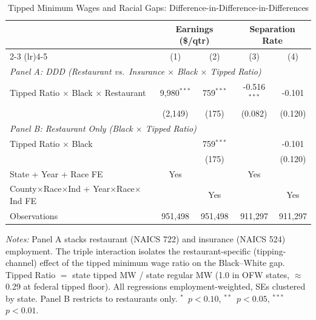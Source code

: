 
\begin{table}[t]
\centering
\caption{Tipped Minimum Wages and Racial Gaps: Difference-in-Difference-in-Differences}
\label{tab:main}
\begin{tabular}{lcccc}
\toprule
 & \multicolumn{2}{c}{Earnings (\$/qtr)} & \multicolumn{2}{c}{Separation Rate} \\
 \cmidrule(lr){2-3} \cmidrule(lr){4-5}
 & (1) & (2) & (3) & (4) \\
\midrule
\multicolumn{5}{l}{\textit{Panel A: DDD (Restaurant vs.\ Insurance $\times$ Black $\times$ Tipped Ratio)}} \\[3pt]
Tipped Ratio $\times$ Black $\times$ Restaurant & 9,980$^{***}$ & 759$^{***}$ & -0.516$^{***}$ & -0.101 \\
 & (2,149) & (175) & (0.082) & (0.120) \\[6pt]
\multicolumn{5}{l}{\textit{Panel B: Restaurant Only (Black $\times$ Tipped Ratio)}} \\[3pt]
Tipped Ratio $\times$ Black & & 759$^{***}$ & & -0.101 \\
 & & (175) & & (0.120) \\[6pt]
\midrule
State + Year + Race FE & Yes & & Yes & \\
County$\times$Race$\times$Ind + Year$\times$Race$\times$Ind FE & & Yes & & Yes \\
Observations & 951,498 & 951,498 & 911,297 & 911,297 \\
\bottomrule
\end{tabular}
\begin{tablenotes}
\small
\item \textit{Notes:} Panel A stacks restaurant (NAICS 722) and insurance (NAICS 524) employment. The triple interaction isolates the restaurant-specific (tipping-channel) effect of the tipped minimum wage ratio on the Black--White gap. Tipped Ratio $=$ state tipped MW / state regular MW (1.0 in OFW states, $\approx$0.29 at federal tipped floor). All regressions employment-weighted, SEs clustered by state. Panel B restricts to restaurants only. $^{*}$~$p<0.10$, $^{**}$~$p<0.05$, $^{***}$~$p<0.01$.
\end{tablenotes}
\end{table}
